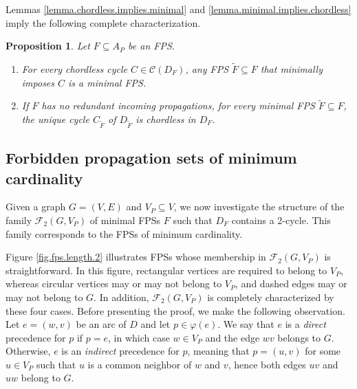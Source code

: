 \documentclass{article}
\newcommand{\CC}{{\mathscr C}}
\newtheorem{proposition}{Proposition}
\begin{document}
Lemmas \ref{lemma.chordless.implies.minimal} and \ref{lemma.minimal.implies.chordless} imply the following complete characterization.

\begin{proposition}\label{prop.characterization.minimal.FPS}
    Let $F \subseteq A_P$ be an FPS. 
    \begin{enumerate}
    \item For every  chordless cycle $C \in \CC(D_F)$, any FPS $\tilde F \subseteq F$ that minimally imposes $C$ is a minimal FPS.
    \label{prop.characterization.minimal.FPS.part.1}
    \item If $F$ has no redundant incoming propagations, for every minimal FPS $\tilde F \subseteq F$, the unique cycle $C_{\tilde F}$ of $D_{\tilde F}$ is chordless in $D_F$.
    \label{prop.characterization.minimal.FPS.part.2} 
    \end{enumerate}
\end{proposition}

\subsection{Forbidden propagation sets of minimum cardinality}

Given a graph $G=(V,E)$ and $V_P \subseteq V$, we now investigate the structure of the family $\mathcal{F}_2(G,V_P)$ of minimal FPSs $F$ such that $D_F$ contains a 2-cycle.
This family corresponds to the FPSs of minimum cardinality.

Figure \ref{fig.fps.length.2} illustrates FPSs whose membership in $\mathcal{F}_2(G, V_P)$ is straightforward.
In this figure, rectangular vertices are required to belong to $V_P$, whereas circular vertices may or may not belong to $V_P$, and dashed edges may or may not belong to $G$. 
In addition, $\mathcal{F}_2(G,V_P)$ is completely characterized by these four cases.
Before presenting the proof, we make the following observation.
Let $e = (w,v)$ be an arc of $D$ and let $p \in \varphi(e)$. 
We say that $e$ is a \emph{direct} precedence for $p$ if $p = e$, in which case $w \in V_P$ and the edge $wv$ belongs to $G$. 
Otherwise, $e$ is an \emph{indirect} precedence for $p$, meaning that $p = (u,v)$ for some $u \in V_P$ such that $u$ is a common neighbor of $w$ and $v$, hence both edges $uv$ and $uw$ belong to $G$.
\end{document}

